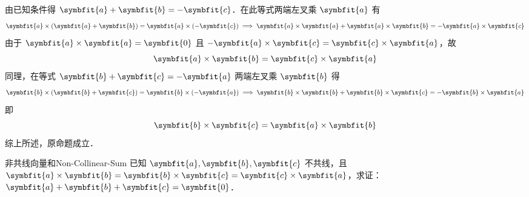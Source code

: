 \begin{myproof}
    由已知条件得 $\symbfit{a} + \symbfit{b} = -\symbfit{c}$．在此等式两端左叉乘 $\symbfit{a}$ 有
    \begin{equation}
        \symbfit{a} \times (\symbfit{a} + \symbfit{b}) = \symbfit{a} \times (-\symbfit{c}) \implies \symbfit{a} \times \symbfit{a} + \symbfit{a} \times \symbfit{b} = -\symbfit{a} \times \symbfit{c}
    \end{equation}
    由于 $\symbfit{a} \times \symbfit{a} = \symbfit{0}$ 且 $-\symbfit{a} \times \symbfit{c} = \symbfit{c} \times \symbfit{a}$，故
    \begin{equation}
        \symbfit{a} \times \symbfit{b} = \symbfit{c} \times \symbfit{a}
    \end{equation}
    同理，在等式 $\symbfit{b} + \symbfit{c} = -\symbfit{a}$ 两端左叉乘 $\symbfit{b}$ 得
    \begin{equation}
        \symbfit{b} \times (\symbfit{b} + \symbfit{c}) = \symbfit{b} \times (-\symbfit{a}) \implies \symbfit{b} \times \symbfit{b} + \symbfit{b} \times \symbfit{c} = -\symbfit{b} \times \symbfit{a}
    \end{equation}
    即
    \begin{equation}
        \symbfit{b} \times \symbfit{c} = \symbfit{a} \times \symbfit{b}
    \end{equation}
    综上所述，原命题成立．
\end{myproof}


\begin{problem}{非共线向量和}{Non-Collinear-Sum}
    已知 $\symbfit{a}, \symbfit{b}, \symbfit{c}$ 不共线，且 $\symbfit{a} \times \symbfit{b} = \symbfit{b} \times \symbfit{c} = \symbfit{c} \times \symbfit{a}$，求证：$\symbfit{a} + \symbfit{b} + \symbfit{c} = \symbfit{0}$．
\end{problem}

